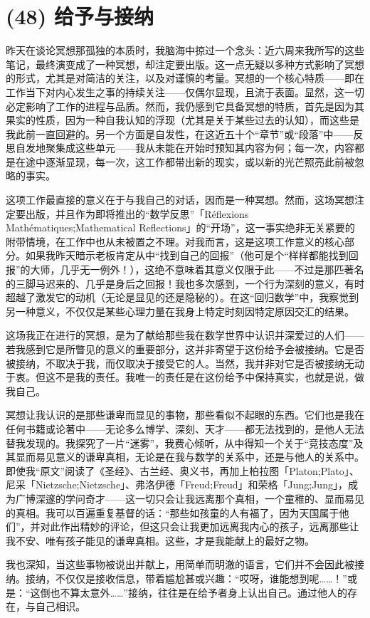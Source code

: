 \section{(48) 给予与接纳}

昨天在谈论冥想那孤独的本质时，我脑海中掠过一个念头：近六周来我所写的这些笔记，最终演变成了一种冥想，却注定要出版。这一点无疑以多种方式影响了冥想的形式，尤其是对简洁的关注，以及对谨慎的考量。冥想的一个核心特质——即在工作当下对内心发生之事的持续关注——仅偶尔显现，且流于表面。显然，这一切必定影响了工作的进程与品质。然而，我仍感到它具备冥想的特质，首先是因为其果实的性质，因为一种自我认知的浮现（尤其是关于某些过去的认知），而这些是我此前一直回避的。另一个方面是自发性，在这近五十个“章节”或“段落”中——反思自发地聚集成这些单元——我从未能在开始时预知其内容为何；每一次，内容都是在途中逐渐显现，每一次，这工作都带出新的现实，或以新的光芒照亮此前被忽略的事实。

这项工作最直接的意义在于与我自己的对话，因而是一种冥想。然而，这场冥想注定要出版，并且作为即将推出的“数学反思”「Réflexions Mathématiques;Mathematical Reflections」的“开场”，这一事实绝非无关紧要的附带情境，在工作中也从未被置之不理。对我而言，这是这项工作意义的核心部分。如果我昨天暗示老板肯定从中“找到自己的回报”（他可是个“样样都能找到回报”的大师，几乎无一例外！），这绝不意味着其意义仅限于此——不过是那匹著名的三脚马迟来的、几乎是身后之回报！我也多次感到，一个行为深刻的意义，有时超越了激发它的动机（无论是显见的还是隐秘的）。在这“回归数学”中，我察觉到另一种意义，不仅仅是某些心理力量在我身上特定时刻因特定原因交汇的结果。

这场我正在进行的冥想，是为了献给那些我在数学世界中认识并深爱过的人们——若我感到它是所瞥见的意义的重要部分，这并非寄望于这份给予会被接纳。它是否被接纳，不取决于我，而仅取决于接受它的人。当然，我并非对它是否被接纳无动于衷。但这不是我的责任。我唯一的责任是在这份给予中保持真实，也就是说，做我自己。

冥想让我认识的是那些谦卑而显见的事物，那些看似不起眼的东西。它们也是我在任何书籍或论著中——无论多么博学、深刻、天才——都无法找到的，是他人无法替我发现的。我探究了一片“迷雾”，我费心倾听，从中得知一个关于“竞技态度”及其显而易见意义的谦卑真相，无论是在我与数学的关系中，还是与他人的关系中。即使我“原文”阅读了《圣经》、古兰经、奥义书，再加上柏拉图「Platon;Plato」、尼采「Nietzsche;Nietzsche」、弗洛伊德「Freud;Freud」和荣格「Jung;Jung」，成为广博深邃的学问奇才——这一切只会让我远离那个真相，一个童稚的、显而易见的真相。我可以百遍重复基督的话：“那些如孩童的人有福了，因为天国属于他们”，并对此作出精妙的评论，但这只会让我更加远离我内心的孩子，远离那些让我不安、唯有孩子能见的谦卑真相。这些，才是我能献上的最好之物。

我也深知，当这些事物被说出并献上，用简单而明澈的语言，它们并不会因此被接纳。接纳，不仅仅是接收信息，带着尴尬甚或兴趣：“哎呀，谁能想到呢……！”或是：“这倒也不算太意外……”接纳，往往是在给予者身上认出自己。通过他人的存在，与自己相识。
